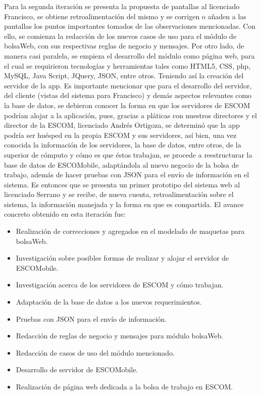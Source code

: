 \noindent
Para la segunda iteración se presenta la propuesta de pantallas al licenciado Francisco, se obtiene retroalimentación del mismo y se corrigen o añaden a las pantallas los puntos importantes tomados de las observaciones mencionadas. Con ello, se comienza la redacción de los nuevos casos de uso para el módulo de bolsaWeb, con sus respectivas reglas de negocio y mensajes.
\newline
\newline
Por otro lado, de manera casi paralela, se empieza el desarrollo del módulo como página web, para el cual se requirieron tecnologías y herramientas tales como HTML5, CSS, php, MySQL, Java Script, JQuery, JSON, entre otros. Teniendo así la creación del servidor de la app. Es importante mencionar que para el desarrollo del servidor, del cliente (vistas del sistema para Francisco) y demás aspectos relevantes como la base de datos, se debieron conocer la forma en que los servidores de ESCOM podrían alojar a la aplicación, pues, gracias a pláticas con nuestros directores y el director de la ESCOM, licenciado Andrés Ortigoza, se determinó que la app podría ser huésped en la propia ESCOM y sus servidores, así bien, una vez conocida la información de los servidores, la base de datos, entre otros, de la superior de cómputo y cómo es que éstos trabajan, se procede a reestructurar la base de datos de ESCOMobile, adaptándola al nuevo negocio de la bolsa de trabajo, además de hacer pruebas con JSON para el envío de información en el sistema.
\newline
Es entonces que se presenta un primer prototipo del sistema web al licenciado Serrano y se recibe, de nueva cuenta, retroalimentación sobre el sistema, la información manejada y la forma en que es compartida. 
\newline
El avance concreto obtenido en esta iteración fue: 
\begin{itemize}
	\item Realización de correcciones y agregados en el modelado de maquetas para bolsaWeb.
	\item Investigación sobre posibles formas de realizar y alojar el servidor de ESCOMobile.
	\item Investigación acerca de los servidores de ESCOM y cómo trabajan.
	\item Adaptación de la base de datos a los nuevos requerimientos.
	\item Pruebas con JSON para el envío de información.
	\item Redacción de reglas de negocio y mensajes para módulo bolsaWeb.
	\item Redacción de casos de uso del módulo mencionado.
	\item Desarrollo de servidor de ESCOMobile.
	\item Realización de página web dedicada a la bolsa de trabajo en ESCOM.
\end{itemize}

